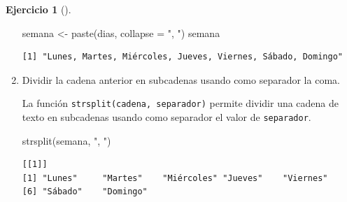 \documentclass[
  spanish,
  a4paper,
]{scrreport}
\newenvironment{Shaded}{\begin{snugshade}}{\end{snugshade}}
\newcommand{\AttributeTok}[1]{\textcolor[rgb]{0.40,0.45,0.13}{#1}}
\newcommand{\FunctionTok}[1]{\textcolor[rgb]{0.28,0.35,0.67}{#1}}
\newcommand{\NormalTok}[1]{\textcolor[rgb]{0.00,0.23,0.31}{#1}}
\newcommand{\OtherTok}[1]{\textcolor[rgb]{0.00,0.23,0.31}{#1}}
\newcommand{\StringTok}[1]{\textcolor[rgb]{0.13,0.47,0.30}{#1}}
\theoremstyle{definition}
\newtheorem{exercise}{Ejercicio}[chapter]
\theoremstyle{remark}
\begin{document}
\begin{exercise}[]
\begin{enumerate}
\begin{tcolorbox}
\begin{Shaded}
\begin{Highlighting}[]
\NormalTok{semana }\OtherTok{\textless{}{-}} \FunctionTok{paste}\NormalTok{(dias, }\AttributeTok{collapse =} \StringTok{", "}\NormalTok{)}
\NormalTok{semana}
\end{Highlighting}
\end{Shaded}

\begin{verbatim}
[1] "Lunes, Martes, Miércoles, Jueves, Viernes, Sábado, Domingo"
\end{verbatim}

  \end{tcolorbox}
\item
  Dividir la cadena anterior en subcadenas usando como separador la
  coma.

  \begin{tcolorbox}[enhanced jigsaw, colback=white, coltitle=black, toprule=.15mm, rightrule=.15mm, opacitybacktitle=0.6, opacityback=0, bottomtitle=1mm, toptitle=1mm, titlerule=0mm, breakable, leftrule=.75mm, title=\textcolor{quarto-callout-tip-color}{\faLightbulb}\hspace{0.5em}{Solución}, arc=.35mm, left=2mm, bottomrule=.15mm, colframe=quarto-callout-tip-color-frame, colbacktitle=quarto-callout-tip-color!10!white]

  La función \texttt{strsplit(cadena,\ separador)} permite dividir una
  cadena de texto en subcadenas usando como separador el valor de
  \texttt{separador}.

\begin{Shaded}
\begin{Highlighting}[]
\FunctionTok{strsplit}\NormalTok{(semana, }\StringTok{", "}\NormalTok{)}
\end{Highlighting}
\end{Shaded}

\begin{verbatim}
[[1]]
[1] "Lunes"     "Martes"    "Miércoles" "Jueves"    "Viernes"  
[6] "Sábado"    "Domingo"  
\end{verbatim}

  \end{tcolorbox}
\end{enumerate}

\end{exercise}
\end{document}
